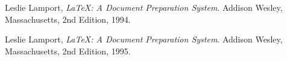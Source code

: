\documentclass[a4paper, 12pt]{report}
\begin{document}
\begin{thebibliography}{99}

  Leslie Lamport,
  \emph{\LaTeX: A Document Preparation System}.
  Addison Wesley, Massachusetts,
  2nd Edition,
  1994.

  Leslie Lamport,
  \emph{\LaTeX: A Document Preparation System}.
  Addison Wesley, Massachusetts,
  2nd Edition,
  1995.

\end{thebibliography}
\end{document}
